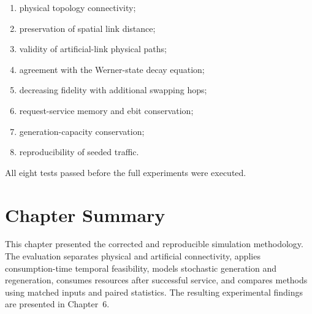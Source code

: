 \begin{enumerate}
    \item physical topology connectivity;
    \item preservation of spatial link distance;
    \item validity of artificial-link physical paths;
    \item agreement with the Werner-state decay equation;
    \item decreasing fidelity with additional swapping hops;
    \item request-service memory and ebit conservation;
    \item generation-capacity conservation;
    \item reproducibility of seeded traffic.
\end{enumerate}

All eight tests passed before the full experiments were executed.

\section{Chapter Summary}

This chapter presented the corrected and reproducible simulation methodology.
The evaluation separates physical and artificial connectivity, applies
consumption-time temporal feasibility, models stochastic generation and
regeneration, consumes resources after successful service, and compares methods
using matched inputs and paired statistics. The resulting experimental findings
are presented in Chapter~6.
